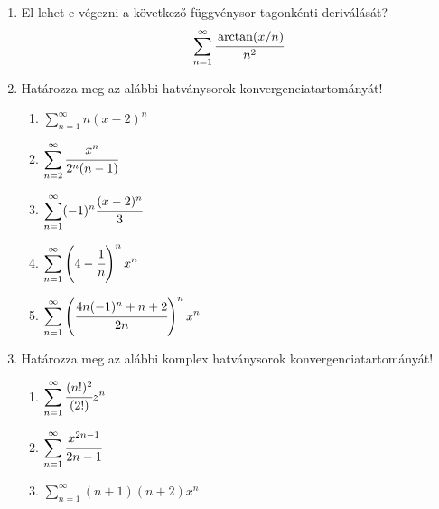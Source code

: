 \documentclass[a4paper, 12pt]{scrartcl}
\begin{document}
\begin{enumerate}
  \item El lehet-e végezni a következő függvénysor tagonkénti deriválását?
        $$
          \sum_{n=1}^{\infty} \cfrac{\arctan(x/n)}{n^2}
        $$

  \item Határozza meg az alábbi hatványsorok konvergenciatartományát!
        \begin{multicols}{2}
          \begin{enumerate}
            \item $\displaystyle
                    \sum_{n=1}^{\infty} n(x-2)^n
                  $

            \item $\displaystyle
                    \sum_{n=2}^{\infty} \cfrac{x^n}{2^n(n-1)}
                  $

            \item $\displaystyle
                    \sum_{n=1}^{\infty} (-1)^n\cfrac{(x-2)^n}{3}
                  $

            \item $\displaystyle
                    \sum_{n=1}^{\infty} \left(4-\cfrac{1}{n}\right)^n x^n
                  $

            \item $\displaystyle
                    \sum_{n=1}^{\infty} \left(\cfrac{4n(-1)^n+n+2}{2n}\right)^nx^n
                  $
          \end{enumerate}
        \end{multicols}

  \item Határozza meg az alábbi komplex hatványsorok konvergenciatartományát!
        \begin{multicols}{3}
          \begin{enumerate}
            \item $\displaystyle
                    \sum_{n=1}^{\infty} \cfrac{(n!)^2}{(2!)}z^n
                  $

            \item $\displaystyle
                    \sum_{n=1}^{\infty} \cfrac{x^{2n-1}}{2n-1}
                  $

            \item $\displaystyle
                    \sum_{n=1}^{\infty} (n+1)(n+2)x^n
                  $
          \end{enumerate}
        \end{multicols}
\end{enumerate}
\end{document}
